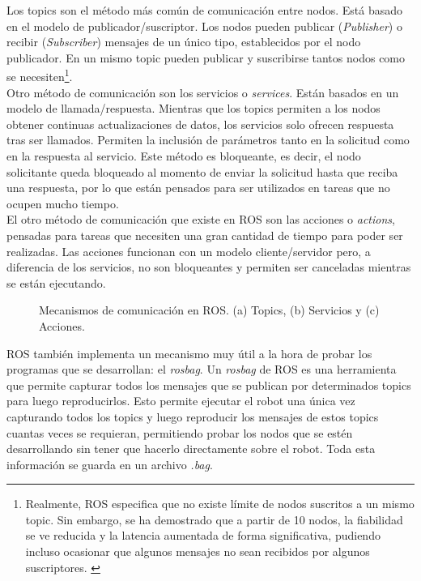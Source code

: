 Los topics son el método más común de comunicación entre nodos. Está basado en el modelo de publicador/suscriptor. Los nodos pueden publicar (\textit{Publisher}) o recibir (\textit{Subscriber}) mensajes de un único tipo, establecidos por el nodo publicador. En un mismo topic pueden publicar y suscribirse tantos nodos como se necesiten\footnote{Realmente, ROS especifica que no existe límite de nodos suscritos a un mismo topic. Sin embargo, se ha demostrado que a partir de 10 nodos, la fiabilidad se ve reducida y la latencia aumentada de forma significativa, pudiendo incluso ocasionar que algunos mensajes no sean recibidos por algunos suscriptores. \cite{issue}}. \\

Otro método de comunicación son los servicios o \textit{services}. Están basados en un modelo de llamada/respuesta. Mientras que los topics permiten a los nodos obtener continuas actualizaciones de datos, los servicios solo ofrecen respuesta tras ser llamados. Permiten la inclusión de parámetros tanto en la solicitud como en la respuesta al servicio. Este método es bloqueante, es decir, el nodo solicitante queda bloqueado al momento de enviar la solicitud hasta que reciba una respuesta, por lo que están pensados para ser utilizados en tareas que no ocupen mucho tiempo.\\

El otro método de comunicación que existe en ROS son las acciones o \textit{actions}, pensadas para tareas que necesiten una gran cantidad de tiempo para poder ser realizadas. Las acciones funcionan con un modelo cliente/servidor pero, a diferencia de los servicios, no son bloqueantes y permiten ser canceladas mientras se están ejecutando.\\

\begin{figure}[H]
 \centering
  \hspace{0.5cm}
 \caption{Mecanismos de comunicación en ROS. (a) Topics, (b) Servicios y (c) Acciones. \cite{roswiki}}
 \label{fig:comm}
\end{figure}

ROS también implementa un mecanismo muy útil a la hora de probar los programas que se desarrollan: el \textit{rosbag}. Un \textit{rosbag} de ROS es una herramienta que permite capturar todos los mensajes que se publican por determinados topics para luego reproducirlos. Esto permite ejecutar el robot una única vez capturando todos los topics y luego reproducir los mensajes de estos topics cuantas veces se requieran, permitiendo probar los nodos que se estén desarrollando sin tener que hacerlo directamente sobre el robot. Toda esta información se guarda en un archivo \textit{.bag}. \cite{roswiki}\\

